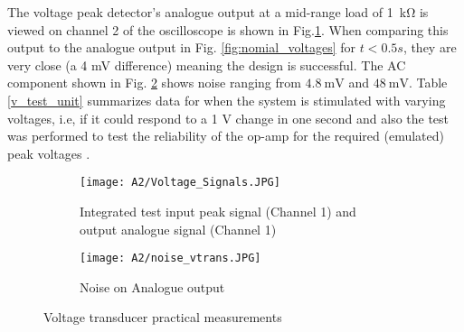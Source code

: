 The voltage peak detector's analogue output at a mid-range load of \SI{1}{\kilo\ohm} is viewed on channel 2 of the oscilloscope is shown in Fig.\ref{subfig:v_ossc}. When comparing this output to the analogue output in Fig. \ref{fig:nomial_voltages} for $t<0.5s$, they are very close (a 4 mV difference) meaning the design is successful. The AC component shown in Fig. \ref{subfig:v_osc_noise} shows noise ranging from $\SI{4.8}{\milli \volt}$ and $\SI{48}{\milli \volt}$. Table \ref{v_test_unit} summarizes data for when the system is stimulated with varying voltages, i.e, if it could respond to a 1 V change in one second and also the test was performed to test the reliability of the op-amp for the required (emulated) peak voltages \cite{assignment_2}.

  \begin{figure}[H]
 \centering
     \begin{subfigure}[scale=.3]{0.45\textwidth}
        \centering
        \texttt{[image: A2/Voltage\_Signals.JPG]}
		\caption{Integrated test input peak signal (Channel 1) and output analogue signal (Channel 1)} \label{subfig:v_ossc}
     \end{subfigure}
      \begin{subfigure}[scale=.4]{0.45\textwidth}
        \centering
  		\texttt{[image: A2/noise\_vtrans.JPG]}
		\caption{Noise on Analogue output}
		\label{subfig:v_osc_noise}
     \end{subfigure}
     \caption{Voltage transducer practical measurements}
\label{voltage_practical}
 \end{figure}

